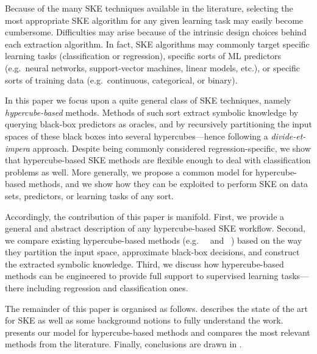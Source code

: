 \documentclass[
]{ceurart}
\begin{document}
Because of the many SKE techniques available in the literature, selecting the most appropriate SKE algorithm for any given learning task may easily become cumbersome.
%
Difficulties may arise because of the intrinsic design choices behind each extraction algorithm.
%
In fact, SKE algorithms may commonly target specific learning tasks (classification or regression), specific sorts of ML predictors (e.g.\ neural networks, support-vector machines, linear models, etc.), or specific sorts of training data (e.g.\ continuous, categorical, or binary).

In this paper we focus upon a quite general class of SKE techniques, namely \emph{hypercube-based} methods.
%
Methods of such sort extract symbolic knowledge by querying black-box predictors as oracles, and by recursively partitioning the input spaces of these black boxes into several hypercubes---hence following a \emph{divide-et-impera} approach.
%
Despite being commonly considered regression-specific, we show that hypercube-based SKE methods are flexible enough to deal with classification problems as well.
%
More generally, we propose a common model for hypercube-based methods, and we show how they can be exploited to perform SKE on data sets, predictors, or learning tasks of any sort.

Accordingly, the contribution of this paper is manifold.
%
First, we provide a general and abstract description of any hypercube-based SKE workflow.
%
Second, we compare existing hypercube-based methods (e.g.\ \iter{}~\cite{huysmans2006iter} and \gridex{}~\cite{gridex-extraamas2021}) based on the way they partition the input space, approximate black-box decisions, and construct the extracted symbolic knowledge.
%
Third, we discuss how hypercube-based methods can be engineered to provide full support to supervised learning tasks---there including regression and classification ones.
%

The remainder of this paper is organised as follows.
%
 describes the state of the art for SKE as well as some background notions to fully understand the work.
%
 presents our model for hypercube-based methods and compares the most relevant methods from the literature. %
%
Finally, conclusions are drawn in .
\end{document}
